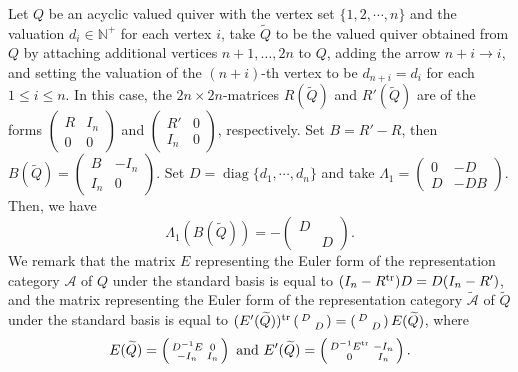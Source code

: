\documentclass[reqno,12pt]{amsart}
\numberwithin{equation}{section}
\theoremstyle{plain} %
\theoremstyle{definition} %
\begin{document}
Let $Q$ be an acyclic valued quiver with the vertex set $\{1,2,\cdots,n\}$ and the valuation $d_i\in\mathbb{N^+}$ for each vertex $i$, take $\widetilde{Q}$ to be the valued quiver obtained from $Q$ by attaching additional vertices $n+1,\ldots, 2n$ to $Q$, adding the arrow $n+i\to i$, and setting the valuation of the $(n+i)$-th vertex to be $d_{n+i}=d_i$ for each $1\leq i\leq n$. In this case, the $2n\times 2n$-matrices $R(\widetilde{Q})$ and $R'(\widetilde{Q})$ are of the forms $\left(\begin{smallmatrix}
    R&I_n\\ 0&0
\end{smallmatrix}\right)$ and $\left(\begin{smallmatrix}
    R'&0\\ I_n&0
\end{smallmatrix}\right)$, respectively.
Set $B=R'-R$, then $B(\widetilde{Q})=\left(\begin{smallmatrix}
    B&-I_n\\ I_n&0
\end{smallmatrix}\right)$.
Set $D=\operatorname{diag}\{d_1,\cdots, d_n\}$ and take $\Lambda_1=\left(\begin{smallmatrix}
    0&-D\\ D&-DB
\end{smallmatrix}\right)$. Then, we have $$\Lambda_1 (B(\widetilde{Q}))=-\left(\begin{smallmatrix}
    D&\\ &D
\end{smallmatrix}\right).$$
We remark that the matrix $E$ representing the Euler form of the representation category $\mathcal{A}$ of $Q$ under the standard basis is equal to $(I_n-R^{\rm tr})D=D(I_n-R')$, and the matrix representing the Euler form of the representation category $\widetilde{\mathcal{A}}$ of $\widetilde{Q}$ under the standard basis is equal to $(E'(\widetilde{Q}))^{\rm tr}\left(\begin{smallmatrix}
    D&\\ &D
\end{smallmatrix}\right)=\left(\begin{smallmatrix}
    D&\\ &D
\end{smallmatrix}\right)E(\widetilde{Q})$,
where \begin{equation*}E(\widetilde{Q})=\left(\begin{smallmatrix}
    D^{-1}E&0\\ -I_n&I_n
\end{smallmatrix}\right)~\text{and}~E'(\widetilde{Q})=\left(\begin{smallmatrix}
    D^{-1}E^{\rm tr}&-I_n\\ 0&I_n
\end{smallmatrix}\right).\end{equation*}
\end{document}
